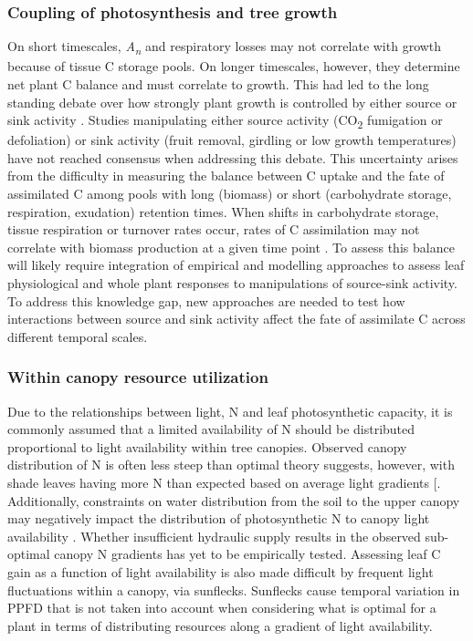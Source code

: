 \documentclass[a4paper]{article}\usepackage[]{graphicx}\usepackage[]{color}
\begin{document}
\subsubsection*{Coupling of photosynthesis and tree growth}
On short timescales, \textit{A\textsubscript{n}} and respiratory losses may not correlate with growth because of tissue C storage pools. On longer timescales, however, they determine net plant C balance and must correlate to growth. This had led to the long standing debate over how strongly plant growth is controlled by either source or sink activity \citep{sweet1966role, korner2013growth}. Studies manipulating either source activity (CO\textsubscript{2} fumigation or defoliation) or sink activity (fruit removal, girdling or low growth temperatures) have not reached consensus when addressing this debate. This uncertainty arises from the difficulty in measuring the balance between C uptake and the fate of assimilated C among pools with long (biomass) or short (carbohydrate storage, respiration, exudation) retention times. When shifts in carbohydrate storage, tissue respiration or turnover rates occur, rates of C assimilation may not correlate with biomass production at a given time point \citep{rocha2006linking, litton2007carbon, gough2008multi}. To assess this balance will likely require integration of empirical and modelling approaches to assess leaf physiological and whole plant responses to manipulations of source-sink activity. To address this knowledge gap, new approaches are needed to test how interactions between source and sink activity affect the fate of assimilate C across different temporal scales. 

\subsubsection*{Within canopy resource utilization}
Due to the relationships between light, N and leaf photosynthetic capacity, it is commonly assumed that a limited availability of N should be distributed proportional to light availability within tree canopies. Observed canopy distribution of N is often less steep than optimal theory suggests, however, with shade leaves having more N than expected based on average light gradients [\citep{peltoniemi2012co}. Additionally, constraints on water distribution from the soil to the upper canopy may negatively impact the distribution of photosynthetic N to canopy light availability \citep{niinemets2012optimization, peltoniemi2012co}. Whether insufficient hydraulic supply results in the observed sub-optimal canopy N gradients has yet to be empirically tested. Assessing leaf C gain as a function of light availability is also made difficult by frequent light fluctuations within a canopy, via sunflecks. Sunflecks cause temporal variation in PPFD that is not taken into account when considering what is optimal for a plant in terms of distributing resources along a gradient of light availability.
\end{document}
